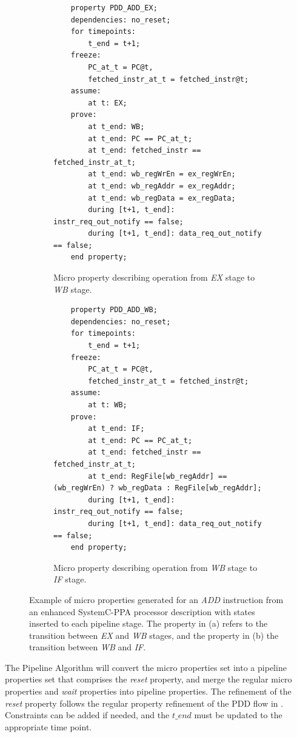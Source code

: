 \begin{figure}[htb!]
     \centering
     \begin{subfigure}[b]{\textwidth}
         \begin{lstlisting}
    property PDD_ADD_EX;
    dependencies: no_reset;
    for timepoints:
        t_end = t+1;
    freeze:
        PC_at_t = PC@t,
        fetched_instr_at_t = fetched_instr@t;
    assume:
        at t: EX;
    prove:
        at t_end: WB;
        at t_end: PC == PC_at_t;
        at t_end: fetched_instr == fetched_instr_at_t;
        at t_end: wb_regWrEn = ex_regWrEn;
        at t_end: wb_regAddr = ex_regAddr;
        at t_end: wb_regData = ex_regData;
        during [t+1, t_end]: instr_req_out_notify == false;
        during [t+1, t_end]: data_req_out_notify == false;
    end property;\end{lstlisting}
         \caption{Micro property describing operation from \textit{EX} stage to \textit{WB} stage.}
         \label{subfig:add-ex-micro-ppt}
     \end{subfigure}
     \hfill
     \begin{subfigure}[b]{\textwidth}
         \begin{lstlisting}
    property PDD_ADD_WB;
    dependencies: no_reset;
    for timepoints:
        t_end = t+1;
    freeze:
        PC_at_t = PC@t,
        fetched_instr_at_t = fetched_instr@t;
    assume:
        at t: WB;
    prove:
        at t_end: IF;
        at t_end: PC == PC_at_t;
        at t_end: fetched_instr == fetched_instr_at_t;
        at t_end: RegFile[wb_regAddr] == (wb_regWrEn) ? wb_regData : RegFile[wb_regAddr];
        during [t+1, t_end]: instr_req_out_notify == false;
        during [t+1, t_end]: data_req_out_notify == false;
    end property;\end{lstlisting}
         \caption{Micro property describing operation from \textit{WB} stage to \textit{IF} stage.}
         \label{subfig:add-wb-micro-ppt}
     \end{subfigure}
        \caption{Example of micro properties generated for an \textit{ADD} instruction from an enhanced SystemC-PPA processor description with states inserted to each pipeline stage. The property in (a) refers to the transition between \textit{EX} and \textit{WB} stages, and the property in (b) the transition between \textit{WB} and \textit{IF}.}
        \label{fig:add-ex-wb-micro-ppt}
\end{figure}

The Pipeline Algorithm will convert the micro properties set into a pipeline properties set that comprises the \textit{reset} property, and merge the regular micro properties and \textit{wait} properties into pipeline properties. The refinement of the \textit{reset} property follows the regular property refinement of the PDD flow in \cite{paper-pdd}. Constraints can be added if needed, and the $t\_end$ must be updated to the appropriate time point.

